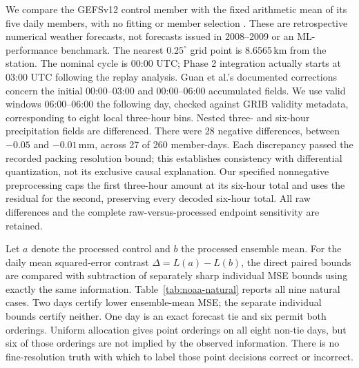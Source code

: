We compare the GEFSv12 control member with the fixed arithmetic mean of its
five daily members, with no fitting or member selection
\cite{guan2022gefs,noaa_gefs_archive}. These are retrospective numerical
weather forecasts, not forecasts issued in 2008--2009 or an ML-performance
benchmark. The nearest $0.25^{\circ}$ grid point is 8.6565\,km from the station.
The nominal cycle is 00:00 UTC; Phase 2 integration actually starts at 03:00
UTC following the replay analysis. Guan et al.'s documented corrections
concern the initial 00:00--03:00 and 00:00--06:00 accumulated fields. We use
valid windows 06:00--06:00 the following day, checked against GRIB validity
metadata, corresponding to eight local three-hour bins. Nested three- and
six-hour precipitation fields are differenced. There were 28 negative
differences, between $-0.05$ and $-0.01$\,mm,
across 27 of 260 member-days. Each discrepancy passed the recorded packing
resolution bound; this establishes consistency with differential quantization,
not its exclusive causal explanation. Our specified nonnegative preprocessing caps the first
three-hour amount at its six-hour total and uses the residual for the second,
preserving every decoded six-hour total. All raw differences and the complete
raw-versus-processed endpoint sensitivity are retained.

Let $a$ denote the processed control and $b$ the processed ensemble mean.
For the daily mean squared-error contrast $\Delta=L(a)-L(b)$, the direct
paired bounds are compared with subtraction of separately sharp individual
MSE bounds using exactly the same information. Table~\ref{tab:noaa-natural}
reports all nine natural cases. Two days certify lower ensemble-mean MSE;
the separate individual bounds certify neither. One day is an exact forecast
tie and six permit both orderings. Uniform allocation gives point orderings
on all eight non-tie days, but six of those orderings are not implied by the
observed information. There is no fine-resolution truth with which to label
those point decisions correct or incorrect.

